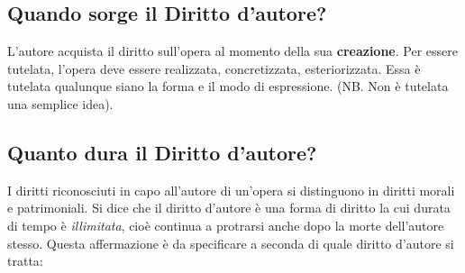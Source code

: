 \subsection{Quando sorge il Diritto d'autore?}
L'autore acquista il diritto sull'opera al momento della sua \textbf{creazione}. \newline
Per essere tutelata, l'opera deve essere realizzata, concretizzata, esteriorizzata. Essa è tutelata
qualunque siano la forma e il modo di espressione. (NB. Non è tutelata una semplice idea).

\subsection{Quanto dura il Diritto d'autore?}
I diritti riconosciuti in capo all'autore di un'opera si distinguono in diritti morali e patrimoniali. \newline
Si dice che il diritto d'autore è una forma di diritto la cui durata di tempo è
\emph{illimitata}, cioè continua a protrarsi anche dopo la morte dell'autore stesso. Questa affermazione è da specificare
a seconda di quale diritto d'autore si tratta:
